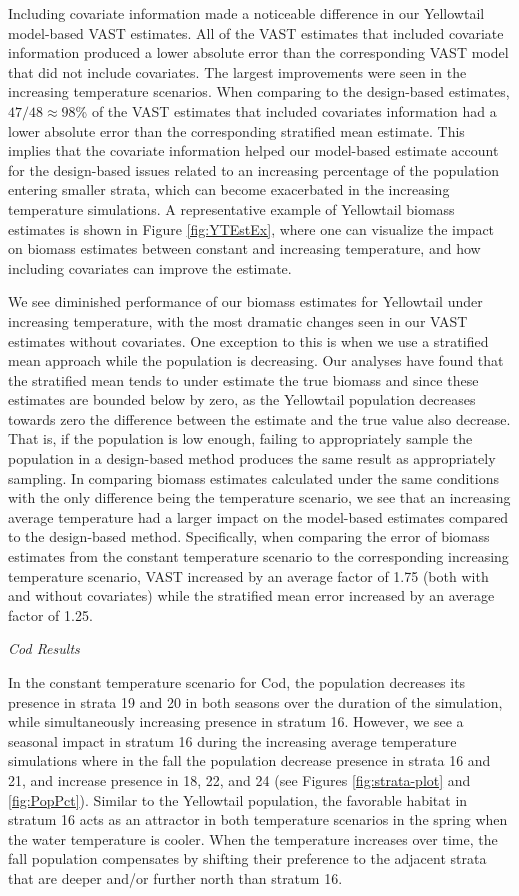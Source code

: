 \documentclass[
  12pt,
]{article}
\begin{document}
Including covariate information made a noticeable difference in our Yellowtail model-based VAST estimates. All of the VAST estimates that included covariate information produced a lower absolute error than the corresponding VAST model that did not include covariates. The largest improvements were seen in the increasing temperature scenarios. When comparing to the design-based estimates, \(47/48\approx98\)\% of the VAST estimates that included covariates information had a lower absolute error than the corresponding stratified mean estimate. This implies that the covariate information helped our model-based estimate account for the design-based issues related to an increasing percentage of the population entering smaller strata, which can become exacerbated in the increasing temperature simulations. A representative example of Yellowtail biomass estimates is shown in Figure \ref{fig:YTEstEx}, where one can visualize the impact on biomass estimates between constant and increasing temperature, and how including covariates can improve the estimate.

We see diminished performance of our biomass estimates for Yellowtail under increasing temperature, with the most dramatic changes seen in our VAST estimates without covariates. One exception to this is when we use a stratified mean approach while the population is decreasing. Our analyses have found that the stratified mean tends to under estimate the true biomass and since these estimates are bounded below by zero, as the Yellowtail population decreases towards zero the difference between the estimate and the true value also decrease. That is, if the population is low enough, failing to appropriately sample the population in a design-based method produces the same result as appropriately sampling. In comparing biomass estimates calculated under the same conditions with the only difference being the temperature scenario, we see that an increasing average temperature had a larger impact on the model-based estimates compared to the design-based method. Specifically, when comparing the error of biomass estimates from the constant temperature scenario to the corresponding increasing temperature scenario, VAST increased by an average factor of 1.75 (both with and without covariates) while the stratified mean error increased by an average factor of 1.25.

\emph{Cod Results}

In the constant temperature scenario for Cod, the population decreases its presence in strata 19 and 20 in both seasons over the duration of the simulation, while simultaneously increasing presence in stratum 16. However, we see a seasonal impact in stratum 16 during the increasing average temperature simulations where in the fall the population decrease presence in strata 16 and 21, and increase presence in 18, 22, and 24 (see Figures \ref{fig:strata-plot} and \ref{fig:PopPct}). Similar to the Yellowtail population, the favorable habitat in stratum 16 acts as an attractor in both temperature scenarios in the spring when the water temperature is cooler. When the temperature increases over time, the fall population compensates by shifting their preference to the adjacent strata that are deeper and/or further north than stratum 16.
\end{document}
